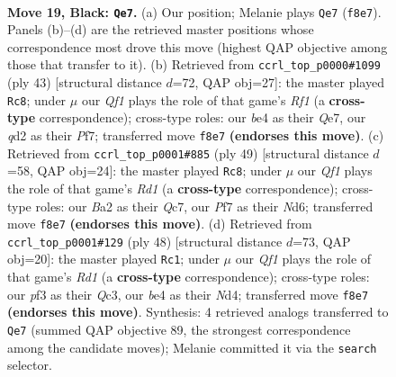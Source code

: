 \documentclass[11pt]{article}
\begin{document}
\clearpage

\begin{figure}[p]\centering
\begin{subfigure}{0.46\textwidth}\centering
\resizebox{\linewidth}{!}{%
\newchessgame
\chessboard[
  setfen={2k2qnr/p1p2ppp/1p6/2p5/4B3/2P2P2/bP1Q2PP/2K4R b - - 1 19},
  showmover=false,
  pgfstyle=straightmove, color=movearrow, markmove={f8-e7}
]}
\caption{}
\end{subfigure}\hfill
\begin{subfigure}{0.46\textwidth}\centering
\resizebox{\linewidth}{!}{%
\newchessgame
\chessboard[
  setfen={5rk1/pb2qp1p/6p1/2pp4/8/1P1BP3/P2Q1PPP/2R3K1 b - - 1 22},
  showmover=false,
  pgfstyle=straightmove, color=movearrow, markmove={f8-c8}
]}
\caption{}
\end{subfigure}
\\[4pt]
\begin{subfigure}{0.46\textwidth}\centering
\resizebox{\linewidth}{!}{%
\newchessgame
\chessboard[
  setfen={3r2k1/p1q2pp1/1p1np2p/4N3/3P3P/P3PQ2/5PP1/3R2K1 b - - 2 25},
  showmover=false,
  pgfstyle=straightmove, color=movearrow, markmove={d8-c8}
]}
\caption{}
\end{subfigure}\hfill
\begin{subfigure}{0.46\textwidth}\centering
\resizebox{\linewidth}{!}{%
\newchessgame
\chessboard[
  setfen={3q2k1/pp1r1pp1/4p1np/3b4/1P1N4/P1Q1PP2/4B1PP/3R2K1 w - - 3 25},
  showmover=false,
  pgfstyle=straightmove, color=movearrow, markmove={d1-c1}
]}
\caption{}
\end{subfigure}
\caption{\textbf{Move 19, Black: \texttt{Qe7}.} (a) Our position; Melanie plays \texttt{Qe7} (\texttt{f8e7}). Panels (b)--(d) are the retrieved master positions whose correspondence most drove this move (highest QAP objective among those that transfer to it). (b) Retrieved from \texttt{ccrl\_top\_p0000\#1099} (ply 43) [structural distance $d$=72, QAP obj=27]: the master played \texttt{Rc8}; under $\mu$ our \emph{Qf1} plays the role of that game's \emph{Rf1} (a \textbf{cross-type} correspondence); cross-type roles: our \emph{b}e4 as their \emph{Q}e7, our \emph{q}d2 as their \emph{P}f7; transferred move \texttt{f8e7} \textbf{(endorses this move)}. (c) Retrieved from \texttt{ccrl\_top\_p0001\#885} (ply 49) [structural distance $d$=58, QAP obj=24]: the master played \texttt{Rc8}; under $\mu$ our \emph{Qf1} plays the role of that game's \emph{Rd1} (a \textbf{cross-type} correspondence); cross-type roles: our \emph{B}a2 as their \emph{Q}c7, our \emph{P}f7 as their \emph{N}d6; transferred move \texttt{f8e7} \textbf{(endorses this move)}. (d) Retrieved from \texttt{ccrl\_top\_p0001\#129} (ply 48) [structural distance $d$=73, QAP obj=20]: the master played \texttt{Rc1}; under $\mu$ our \emph{Qf1} plays the role of that game's \emph{Rd1} (a \textbf{cross-type} correspondence); cross-type roles: our \emph{p}f3 as their \emph{Q}c3, our \emph{b}e4 as their \emph{N}d4; transferred move \texttt{f8e7} \textbf{(endorses this move)}. Synthesis: 4 retrieved analogs transferred to \texttt{Qe7} (summed QAP objective 89, the strongest correspondence among the candidate moves); Melanie committed it via the \texttt{search} selector.}
\label{fig:thought-m37}
\end{figure}
\end{document}
